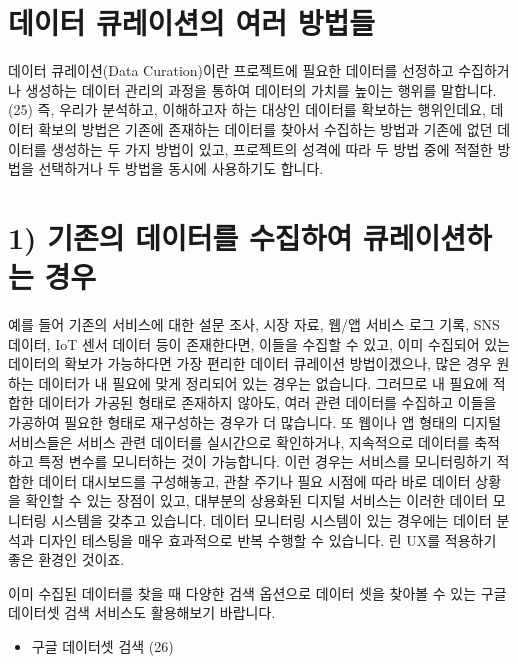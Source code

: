 \documentclass[
  letterpaper,
]{book}
\providecommand{\tightlist}{%
  \setlength{\itemsep}{0pt}\setlength{\parskip}{0pt}}\usepackage{longtable,booktabs,array}
\begin{document}
\section{데이터 큐레이션의 여러
방법들}\label{uxb370uxc774uxd130-uxd050uxb808uxc774uxc158uxc758-uxc5ecuxb7ec-uxbc29uxbc95uxb4e4}

데이터 큐레이션(Data Curation)이란 프로젝트에 필요한 데이터를 선정하고
수집하거나 생성하는 데이터 관리의 과정을 통하여 데이터의 가치를 높이는
행위를 말합니다.(25) 즉, 우리가 분석하고, 이해하고자 하는 대상인
데이터를 확보하는 행위인데요, 데이터 확보의 방법은 기존에 존재하는
데이터를 찾아서 수집하는 방법과 기존에 없던 데이터를 생성하는 두 가지
방법이 있고, 프로젝트의 성격에 따라 두 방법 중에 적절한 방법을
선택하거나 두 방법을 동시에 사용하기도 합니다.

\section{1) 기존의 데이터를 수집하여 큐레이션하는
경우}\label{uxae30uxc874uxc758-uxb370uxc774uxd130uxb97c-uxc218uxc9d1uxd558uxc5ec-uxd050uxb808uxc774uxc158uxd558uxb294-uxacbduxc6b0}

예를 들어 기존의 서비스에 대한 설문 조사, 시장 자료, 웹/앱 서비스 로그
기록, SNS 데이터, IoT 센서 데이터 등이 존재한다면, 이들을 수집할 수
있고, 이미 수집되어 있는 데이터의 확보가 가능하다면 가장 편리한 데이터
큐레이션 방법이겠으나, 많은 경우 원하는 데이터가 내 필요에 맞게 정리되어
있는 경우는 없습니다. 그러므로 내 필요에 적합한 데이터가 가공된 형태로
존재하지 않아도, 여러 관련 데이터를 수집하고 이들을 가공하여 필요한
형태로 재구성하는 경우가 더 많습니다. 또 웹이나 앱 형태의 디지털
서비스들은 서비스 관련 데이터를 실시간으로 확인하거나, 지속적으로
데이터를 축적하고 특정 변수를 모니터하는 것이 가능합니다. 이런 경우는
서비스를 모니터링하기 적합한 데이터 대시보드를 구성해놓고, 관찰 주기나
필요 시점에 따라 바로 데이터 상황을 확인할 수 있는 장점이 있고, 대부분의
상용화된 디지털 서비스는 이러한 데이터 모니터링 시스템을 갖추고
있습니다. 데이터 모니터링 시스템이 있는 경우에는 데이터 분석과 디자인
테스팅을 매우 효과적으로 반복 수행할 수 있습니다. 린 UX를 적용하기 좋은
환경인 것이죠.

이미 수집된 데이터를 찾을 때 다양한 검색 옵션으로 데이터 셋을 찾아볼 수
있는 구글 데이터셋 검색 서비스도 활용해보기 바랍니다.

\begin{itemize}
\tightlist
\item
  구글 데이터셋 검색 (26)
\end{itemize}
\end{document}
